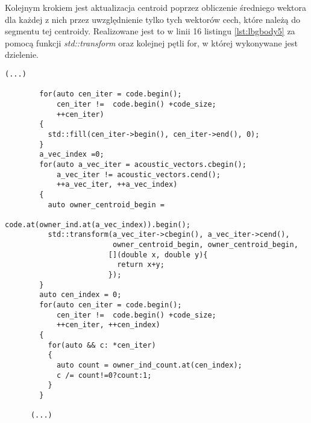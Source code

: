 Kolejnym krokiem jest aktualizacja centroid poprzez obliczenie średniego wektora dla każdej z nich przez uwzględnienie tylko tych wektorów cech, które należą do segmentu tej centroidy. Realizowane jest to w linii 16 listingu {\ref{lst:lbgbody5}} za pomocą funkcji \textit{std::transform} oraz kolejnej pętli for, w której wykonywane jest dzielenie.
\begin{lstlisting}[style=lst:cpp, caption=Funkcja \textit{lbg}\label{lst:lbgbody5} - obliczenie ogólnego dopasowania]
      (...)

        for(auto cen_iter = code.begin();
            cen_iter !=  code.begin() +code_size;
            ++cen_iter)
        {
          std::fill(cen_iter->begin(), cen_iter->end(), 0);
        }
        a_vec_index =0;
        for(auto a_vec_iter = acoustic_vectors.cbegin();
            a_vec_iter != acoustic_vectors.cend();
            ++a_vec_iter, ++a_vec_index)
        {
          auto owner_centroid_begin =
                              code.at(owner_ind.at(a_vec_index)).begin();
          std::transform(a_vec_iter->cbegin(), a_vec_iter->cend(),
                         owner_centroid_begin, owner_centroid_begin,
                        [](double x, double y){
                          return x+y; 
                        });
        }
        auto cen_index = 0;
        for(auto cen_iter = code.begin();
            cen_iter !=  code.begin() +code_size;
            ++cen_iter, ++cen_index)
        {
          for(auto && c: *cen_iter)
          {
            auto count = owner_ind_count.at(cen_index);
            c /= count!=0?count:1;
          }
        }

      (...)
\end{lstlisting}
